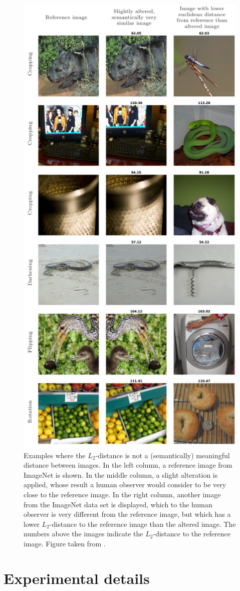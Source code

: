 \begin{figure}[h!]
    \centering
    \includegraphics[width=.5\textwidth]{chapter4/figures/L2bad.pdf}
    \caption{Examples where the $L_2$-distance is not a (semantically) meaningful distance between images. In the left column, a reference image from ImageNet \citep{imagenet} is shown. In the middle column, a slight alteration is applied, whose result a human observer would consider to be very close to the reference image. In the right column, another image from the ImageNet data set is displayed, which to the human observer is very different from the reference image, but which has a lower $L_2$-distance to the reference image than the altered image. The numbers above the images indicate the $L_2$-distance to the reference image. Figure taken from \cite{stanczuk2021wasserstein}.}
    \label{ch4:fig:L2bad}
\end{figure}

\section{Experimental details} \label{ch4:Experimental_details}


